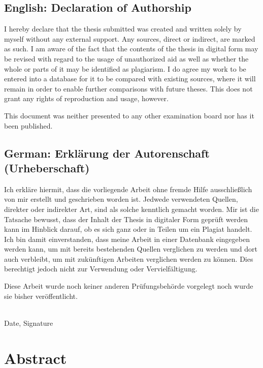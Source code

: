 \documentclass[a4paper,11pt,oneside]{article}
\begin{document}
  \subsection*{English: Declaration of Authorship}

  I hereby declare that the thesis submitted was created and written solely by myself without any external support. Any sources, direct or indirect, are marked as such. I am aware of the fact that the contents of the thesis in digital form may be revised with regard to the usage of unauthorized aid as well as whether the whole or parts of it may be identified as plagiarism. I do agree my work to be entered into a database for it to be compared with existing sources, where it will remain in order to enable further comparisons with future theses. This does not grant any rights of reproduction and usage, however.

  This document was neither presented to any other examination board nor has it been published.

  \subsection*{German: Erklärung der Autorenschaft (Urheberschaft)}

  Ich erkläre hiermit, dass die vorliegende Arbeit ohne fremde Hilfe ausschließlich von mir erstellt und geschrieben worden ist. Jedwede verwendeten Quellen, direkter oder indirekter Art, sind als solche kenntlich gemacht worden. Mir ist die Tatsache bewusst, dass der Inhalt der Thesis in digitaler Form geprüft werden kann im Hinblick darauf, ob es sich ganz oder in Teilen um ein Plagiat handelt. Ich bin damit einverstanden, dass meine Arbeit in einer Datenbank eingegeben werden kann, um mit bereits bestehenden Quellen verglichen zu werden und dort auch verbleibt, um mit zukünftigen Arbeiten verglichen werden zu können. Dies berechtigt jedoch nicht zur Verwendung oder Vervielfältigung.

  Diese Arbeit wurde noch keiner anderen Prüfungsbehörde vorgelegt noch wurde sie bisher veröffentlicht.

  \vspace{20mm}

  \dotfill\\
  Date, Signature

  \newpage

  \section*{Abstract}
\end{document}
